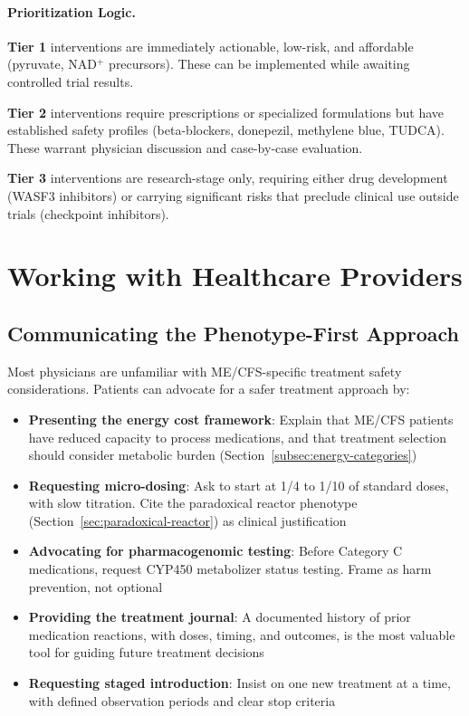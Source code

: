 \paragraph{Prioritization Logic.}

\textbf{Tier 1} interventions are immediately actionable, low-risk, and affordable (pyruvate, NAD$^+$ precursors). These can be implemented while awaiting controlled trial results.

\textbf{Tier 2} interventions require prescriptions or specialized formulations but have established safety profiles (beta-blockers, donepezil, methylene blue, TUDCA). These warrant physician discussion and case-by-case evaluation.

\textbf{Tier 3} interventions are research-stage only, requiring either drug development (WASF3 inhibitors) or carrying significant risks that preclude clinical use outside trials (checkpoint inhibitors).

\section{Working with Healthcare Providers}
\label{sec:working-with-providers}

\subsection{Communicating the Phenotype-First Approach}

Most physicians are unfamiliar with ME/CFS-specific treatment safety considerations. Patients can advocate for a safer treatment approach by:

\begin{itemize}
    \item \textbf{Presenting the energy cost framework}: Explain that ME/CFS patients have reduced capacity to process medications, and that treatment selection should consider metabolic burden (Section~\ref{subsec:energy-categories})
    \item \textbf{Requesting micro-dosing}: Ask to start at 1/4 to 1/10 of standard doses, with slow titration. Cite the paradoxical reactor phenotype (Section~\ref{sec:paradoxical-reactor}) as clinical justification
    \item \textbf{Advocating for pharmacogenomic testing}: Before Category C medications, request CYP450 metabolizer status testing. Frame as harm prevention, not optional
    \item \textbf{Providing the treatment journal}: A documented history of prior medication reactions, with doses, timing, and outcomes, is the most valuable tool for guiding future treatment decisions
    \item \textbf{Requesting staged introduction}: Insist on one new treatment at a time, with defined observation periods and clear stop criteria
\end{itemize}

